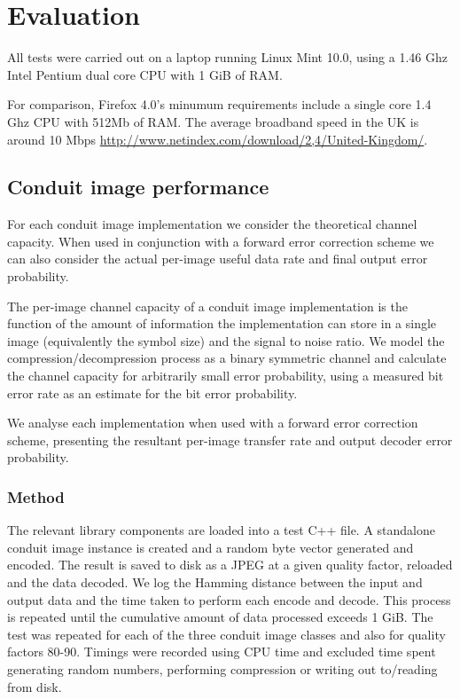 \chapter{Evaluation}\label{ch:evaluation}

All tests were carried out on a laptop running Linux Mint 10.0, using a 1.46 Ghz Intel Pentium dual core CPU with 1 GiB of RAM.

For comparison, Firefox 4.0's minumum requirements include a single core 1.4 Ghz CPU with 512Mb of RAM. The average broadband speed in the UK is around 10 Mbps \url{http://www.netindex.com/download/2,4/United-Kingdom/}. 

\section{Conduit image performance}

For each conduit image implementation we consider the theoretical channel capacity. When used in conjunction with a forward error correction scheme we can also consider the actual per-image useful data rate and final output error probability.

The per-image channel capacity of a conduit image implementation is the function of the amount of information the implementation can store in a single image (equivalently the symbol size) and the signal to noise ratio. We model the compression/decompression process as a binary symmetric channel and calculate the channel capacity for arbitrarily small error probability, using a measured bit error rate as an estimate for the bit error probability.

We analyse each implementation when used with a forward error correction scheme, presenting the resultant per-image transfer rate and output decoder error probability.

\subsection{Method}

The relevant library components are loaded into a test C++ file. A standalone conduit image instance is created and a random byte vector generated and encoded. The result is saved to disk as a JPEG at a given quality factor, reloaded and the data decoded. We log the Hamming distance between the input and output data and the time taken to perform each encode and decode. This process is repeated until the cumulative amount of data processed exceeds 1 GiB. The test was repeated for each of the three conduit image classes and also for quality factors 80-90. Timings were recorded using CPU time and excluded time spent generating random numbers, performing compression or writing out to/reading from disk.

